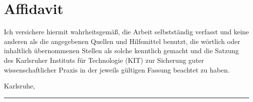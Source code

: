 
\chapter{Affidavit}
\label{ch:Affidavit}

Ich versichere hiermit wahrheitsgemäß, die Arbeit selbstständig verfasst und keine anderen als die angegebenen Quellen und Hilfsmittel benutzt, die wörtlich oder inhaltlich übernommenen Stellen als solche kenntlich gemacht und die Satzung des Karlsruher Instituts für Technologie (KIT) zur Sicherung guter wissenschaftlicher Praxis in der jeweils gültigen Fassung beachtet zu haben.

\vspace*{1cm}
\begin{flushright}
Karlsruhe, \submissiontime \hspace*{0.5cm} \rule{0.4\textwidth}{0.5pt} \\
\myname \hspace*{1.3cm}
\end{flushright}


